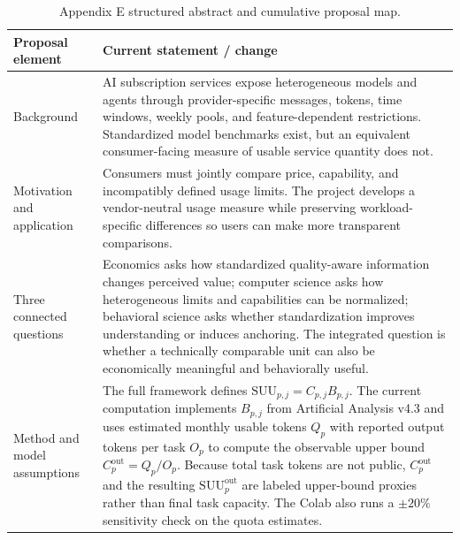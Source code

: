 \documentclass[sigconf,nonacm]{acmart}
\begin{document}
\begin{table}[H]

\caption{
Appendix E structured abstract and cumulative proposal map.
}

\label{tab:abstract-map}

\renewcommand{\arraystretch}{1.18}

\begin{tabularx}{
\textwidth
}{
@{}
p{}
Y
@{}
}

\toprule

\textbf{Proposal element}
&
\textbf{Current statement / change}
\\

\midrule

Background
&
AI subscription services expose heterogeneous models and agents through
provider-specific messages,
tokens,
time windows,
weekly pools,
and feature-dependent restrictions.
Standardized model benchmarks exist,
but an equivalent consumer-facing measure of usable service quantity does not.
\\

Motivation and application
&
Consumers must jointly compare price,
capability,
and incompatibly defined usage limits.
The project develops a vendor-neutral usage measure while preserving
workload-specific differences so users can make more transparent comparisons.
\\

Three connected questions
&
Economics asks how standardized quality-aware information changes perceived
value;
computer science asks how heterogeneous limits and capabilities can be
normalized;
behavioral science asks whether standardization improves understanding or
induces anchoring.
The integrated question is whether a technically comparable unit can also be
economically meaningful and behaviorally useful.
\\

Method and model assumptions
&
The full framework defines
$\mathrm{SUU}_{p,j}=C_{p,j}B_{p,j}$.
The current computation implements $B_{p,j}$ from Artificial Analysis v4.3 and
uses estimated monthly usable tokens $Q_p$ with reported output tokens per task
$O_p$ to compute the observable upper bound
$C_p^{\mathrm{out}}=Q_p/O_p$. Because total task tokens are not public,
$C_p^{\mathrm{out}}$ and the resulting $\mathrm{SUU}_p^{\mathrm{out}}$
are labeled upper-bound proxies rather than final task capacity. The Colab also
runs a $\pm20\%$ sensitivity check on the quota estimates.
\\


\end{tabularx}
\end{table}
\end{document}
